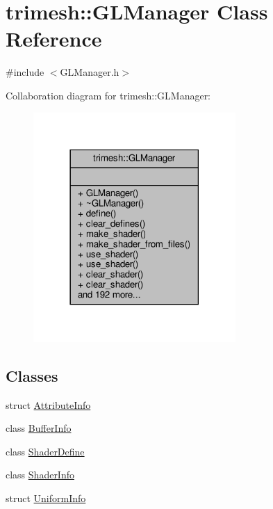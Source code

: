 \hypertarget{classtrimesh_1_1GLManager}{}\section{trimesh\+:\+:G\+L\+Manager Class Reference}
\label{classtrimesh_1_1GLManager}


{\ttfamily \#include $<$G\+L\+Manager.\+h$>$}



Collaboration diagram for trimesh\+:\+:G\+L\+Manager\+:\nopagebreak
\begin{figure}[H]
\begin{center}
\leavevmode
\includegraphics[width=218pt]{d8/d47/classtrimesh_1_1GLManager__coll__graph}
\end{center}
\end{figure}
\subsection*{Classes}
\begin{DoxyCompactItemize}
\item 
struct \hyperlink{structtrimesh_1_1GLManager_1_1AttributeInfo}{Attribute\+Info}
\item 
class \hyperlink{classtrimesh_1_1GLManager_1_1BufferInfo}{Buffer\+Info}
\item 
class \hyperlink{classtrimesh_1_1GLManager_1_1ShaderDefine}{Shader\+Define}
\item 
class \hyperlink{classtrimesh_1_1GLManager_1_1ShaderInfo}{Shader\+Info}
\item 
struct \hyperlink{structtrimesh_1_1GLManager_1_1UniformInfo}{Uniform\+Info}
\end{DoxyCompactItemize}
